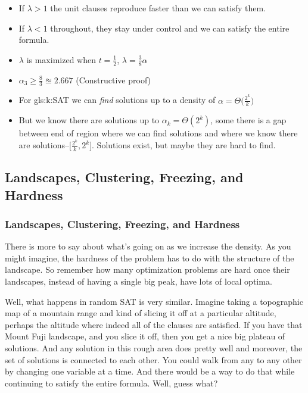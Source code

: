 \documentclass[]{article}
\begin{document}
\begin{itemize}
	\item If $\lambda>1$ the unit clauses reproduce faster than we can satisfy them.
	\item If $\lambda<1$ throughout, they stay under control and we can satisfy the entire formula. 
	\item $\lambda$ is maximized when $t=\frac{1}{2}$, $\lambda = \frac{3}{8} \alpha$
	\item $\alpha_3\ge\frac{8}{3}\approxeq2.667$ (Constructive proof)
	\item For \gls{gls:k:SAT} we can \emph{find} solutions up to a density of $\alpha = \Theta\big(\frac{2^k}{k}\big)$
	\item But we know there are solutions up to $\alpha_k=\Theta(2^k)$, some there is a gap between end of region where we can find solutions and where we know there are solutions--$\big[\frac{2^k}{k},2^k\big]$. Solutions exist, but maybe they are hard to find.
\end{itemize}

\subsection{Landscapes, Clustering, Freezing, and Hardness }

\subsubsection{Landscapes, Clustering, Freezing, and Hardness }

There is more to say about what's going on as we increase the density.
As you might imagine, the hardness of the problem has to do with the structure of the landscape. 
So remember how many optimization problems are hard once their landscapes, instead of having a single big peak, have lots of local optima.

Well, what happens in random SAT is very similar.
Imagine taking a topographic map of a mountain range and kind of slicing it off at a particular altitude, perhaps the altitude where indeed all of the clauses are satisfied.
If you have that Mount Fuji landscape, and you slice it off, then you get a nice big plateau of solutions.
And any solution in this rough area does pretty well and moreover, the set of solutions is connected to each other.
You could walk from any to any other by changing one variable at a time.
And there would be a way to do that while continuing to satisfy the entire formula.
Well, guess what?
\end{document}
